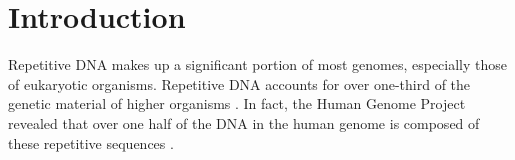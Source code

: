 \section{Introduction}
\label{intro}
Repetitive DNA makes up a significant portion of most genomes, especially those of eukaryotic organisms. Repetitive DNA accounts for over one-third of the genetic material of higher organisms \cite{britten1968repeated}. In fact, the Human Genome Project revealed that over one half of the DNA in the human genome is composed of these repetitive sequences \cite{lander2001initial}.

